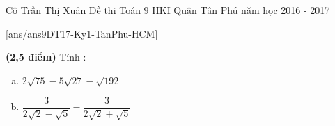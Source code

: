 \begin{name}
{Cô Trần Thị Xuân}
{Đề thi Toán 9 HKI Quận Tân Phú năm học 2016 - 2017}
\end{name}
\setcounter{ex}{0}
[ans/ans9DT17-Ky1-TanPhu-HCM]
\begin{ex} {\bf (2,5 điểm)}  %
	Tính :
\begin{multicols}{2}
\begin{enumerate}[a.]
	\item $2\sqrt{75}-5\sqrt{27}-\sqrt{192}$
	\item $\dfrac{3}{2\sqrt{2}-\sqrt{5}}-\dfrac{3}{2\sqrt{2}+\sqrt{5}}$ 
	\end{enumerate}
\end{multicols}
\end{ex}
